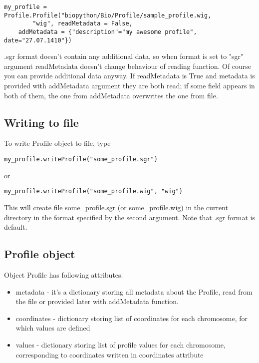 \documentclass[a4paper,11pt,portrait]{article}
\begin{document}
\begin{verbatim}
my_profile = Profile.Profile("biopython/Bio/Profile/sample_profile.wig,
		"wig", readMetadata = False,
	addMetadata = {"description"="my awesome profile", date="27.07.1410"})
\end{verbatim}

.sgr format doesn't contain any additional data,
 so when format is set to "sgr" argument readMetadata doesn't change behaviour of reading function.
 Of course you can provide additional data anyway.
 If readMetadata is True and metadata is provided with addMetadata argument
 they are both read;
 if some field appears in both of them,
 the one from addMetadata overwrites the one from file.

\subsection{Writing to file}

To write Profile object to file, type

\begin{verbatim}
my_profile.writeProfile("some_profile.sgr")
\end{verbatim}

or

\begin{verbatim}
my_profile.writeProfile("some_profile.wig", "wig")
\end{verbatim}

This will create file some\_profile.sgr (or some\_profile.wig) in the current directory
 in the format specified by the second argument.
 Note that .sgr format is default.


\subsection{Profile object}

Object Profile has following attributes:

	\begin{itemize}

		\item metadata - it's a dictionary storing all metadata about the Profile,
			read from the file or provided later with addMetadata function.
		\item coordinates - dictionary storing list of coordinates
			for each chromosome,
			for which values are defined
		\item values - dictionary storing list of profile values for each chromosome,
			corresponding to coordinates written in coordinates attribute

	\end{itemize}
\end{document}
